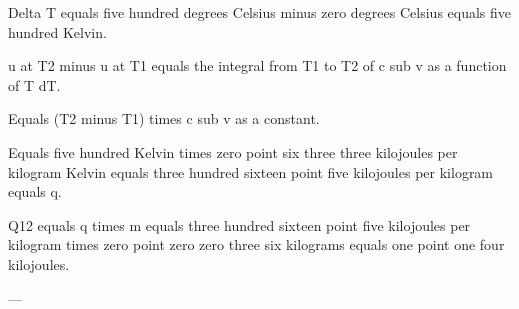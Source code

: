 Delta T equals five hundred degrees Celsius minus zero degrees Celsius equals five hundred Kelvin.  

u at T2 minus u at T1 equals the integral from T1 to T2 of c sub v as a function of T dT.  

Equals (T2 minus T1) times c sub v as a constant.  

Equals five hundred Kelvin times zero point six three three kilojoules per kilogram Kelvin equals three hundred sixteen point five kilojoules per kilogram equals q.  

Q12 equals q times m equals three hundred sixteen point five kilojoules per kilogram times zero point zero zero three six kilograms equals one point one four kilojoules.  

---